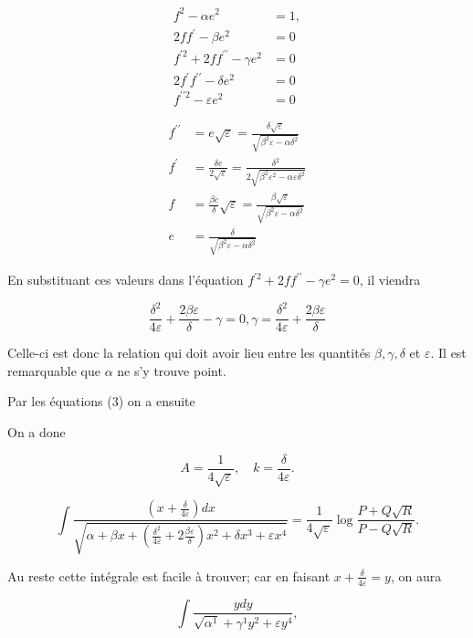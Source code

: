 \documentclass{article}
\begin{document}
\[
\begin{aligned}
f^{2}-\alpha e^{2} & =1, \\
2 f f^{\prime}-\beta e^{2} & =0 \\
f^{\prime 2}+2 f f^{\prime \prime}-\gamma e^{2} & =0 \\
2 f^{\prime} f^{\prime \prime}-\delta e^{2} & =0 \\
f^{\prime \prime 2}-\varepsilon e^{2} & =0
\end{aligned}
\]

\[
\begin{aligned}
f^{\prime \prime} & =e \sqrt{\varepsilon}=\frac{\delta \sqrt{\varepsilon}}{\sqrt{\beta^{2} \varepsilon-\alpha \delta^{2}}} \\
f^{\prime} & =\frac{\delta e}{2 \sqrt{\varepsilon}}=\frac{\delta^{2}}{2 \sqrt{\beta^{2} \varepsilon^{2}-\alpha \varepsilon \delta^{2}}} \\
f & =\frac{\beta e}{\delta} \sqrt{\varepsilon}=\frac{\beta \sqrt{\varepsilon}}{\sqrt{\beta^{2} \varepsilon-\alpha \delta^{2}}} \\
e & =\frac{\delta}{\sqrt{\beta^{2} \varepsilon-\alpha \delta^{2}}}
\end{aligned}
\]

En substituant ces valeurs dans l'équation \(f^{\prime 2}+2 f f^{\prime \prime}-\gamma e^{2}=0\), il viendra

\[
\frac{\delta^{2}}{4 \varepsilon}+\frac{2 \beta \varepsilon}{\delta}-\gamma=0, \gamma=\frac{\delta^{2}}{4 \varepsilon}+\frac{2 \beta \varepsilon}{\delta}
\]

Celle-ci est donc la relation qui doit avoir lieu entre les quantités \(\beta, \gamma, \delta\) et \(\varepsilon\). Il est remarquable que \(\alpha\) ne s'y trouve point.

Par les équations (3) on a ensuite

On a done

\[
A=\frac{1}{4 \sqrt{\varepsilon}}, \quad k=\frac{\delta}{4 \varepsilon} .
\]

\[
\int \frac{\left(x+\frac{\delta}{4 \varepsilon}\right) d x}{\sqrt{\alpha+\beta x+\left(\frac{\delta^{2}}{4 \varepsilon}+2 \frac{\beta \varepsilon}{\delta}\right) x^{2}+\delta x^{3}+\varepsilon x^{4}}}=\frac{1}{4 \sqrt{\varepsilon}} \log \frac{P+Q \sqrt{R}}{P-Q \sqrt{R}} .
\]

\(\mathrm{Au}\) reste cette intégrale est facile à trouver; car en faisant \(x+\frac{\delta}{4 \varepsilon}=y\), on aura

\[
\int \frac{y d y}{\sqrt{\alpha^{1}}+\gamma^{1} y^{2}+\varepsilon y^{4}},
\]
\end{document}
